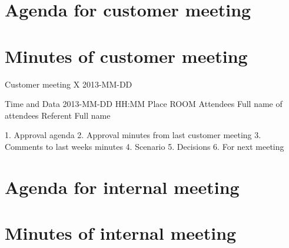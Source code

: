 \section{Agenda for customer meeting}

\section{Minutes of customer meeting}

Customer meeting X 
2013-MM-DD

Time and Data 	2013-MM-DD HH:MM
Place			ROOM
Attendees  		Full name of attendees
Referent  		Full name

1. Approval agenda
2. Approval minutes from last customer meeting
3. Comments to last weeks minutes
4. Scenario
5. Decisions
6. For next meeting

\section{Agenda for internal meeting}

\section{Minutes of internal meeting}